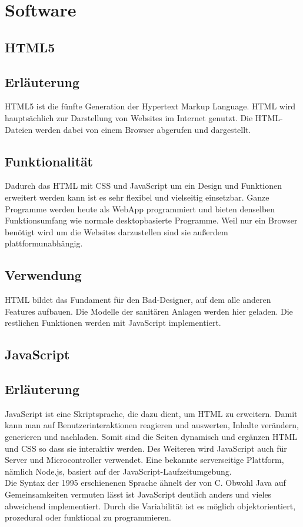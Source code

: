 \chapter{Software}


\section{HTML5}

\section*{Erläuterung}
HTML5 ist die fünfte Generation der Hypertext Markup Language. HTML wird hauptsächlich zur Darstellung von Websites im Internet genutzt. Die HTML-Dateien werden dabei von einem Browser abgerufen und dargestellt.

\section*{Funktionalität}
Dadurch das HTML mit CSS und JavaScript um ein Design und Funktionen erweitert werden kann ist es sehr flexibel und vielseitig einsetzbar. Ganze Programme werden heute als WebApp programmiert und bieten denselben Funktionsumfang wie normale desktopbasierte Programme. Weil nur ein Browser benötigt wird um die Websites darzustellen sind sie außerdem plattformunabhängig.


\section*{Verwendung}
HTML bildet das Fundament für den Bad-Designer, auf dem alle anderen Features aufbauen. Die Modelle der sanitären Anlagen werden hier geladen. Die restlichen Funktionen werden mit JavaScript implementiert.

\newpage
\clearpage

\section{JavaScript}\label{sec:JavaScript}

\section*{Erläuterung}
JavaScript ist eine Skriptsprache, die dazu dient, um HTML zu erweitern. Damit kann man auf Benutzerinteraktionen reagieren und auswerten, Inhalte verändern, generieren und nachladen. Somit sind die Seiten dynamisch und ergänzen HTML und CSS so dass sie interaktiv werden. Des Weiteren wird JavaScript auch für Server und Microcontroller verwendet. Eine bekannte serverseitige Plattform, nämlich Node.js, basiert auf der JavaScript-Laufzeitumgebung. 
\\
Die Syntax der 1995 erschienenen Sprache ähnelt der von C. Obwohl Java auf Gemeinsamkeiten vermuten lässt ist JavaScript deutlich anders und vieles abweichend implementiert. Durch die Variabilität ist es möglich objektorientiert, prozedural oder funktional zu programmieren.

